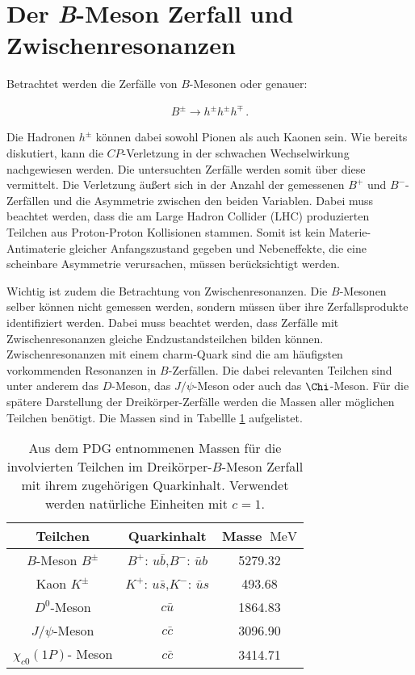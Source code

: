 \section{Der \textbf{\textit{B}}-Meson Zerfall und Zwischenresonanzen}

Betrachtet werden die Zerfälle von $B$-Mesonen oder genauer:

\begin{align}
    B^{\pm} \to h^{\pm} h^{\pm}  h^{\mp} \, .
\end{align}

Die Hadronen $h^\pm$ können dabei sowohl Pionen als auch Kaonen sein. Wie bereits diskutiert, kann die
$CP$-Verletzung in der schwachen Wechselwirkung nachgewiesen werden. Die untersuchten Zerfälle
werden somit über diese vermittelt. Die Verletzung äußert sich in der Anzahl der gemessenen
$B^+$ und $B^-$-Zerfällen und die Asymmetrie zwischen den beiden Variablen. Dabei muss beachtet
werden, dass die am Large Hadron Collider (LHC) produzierten Teilchen aus Proton-Proton
Kollisionen stammen. Somit ist kein Materie-Antimaterie gleicher Anfangszustand gegeben
und Nebeneffekte, die eine scheinbare Asymmetrie verursachen, müssen berücksichtigt werden. \par

Wichtig ist zudem die Betrachtung von Zwischenresonanzen. Die $B$-Mesonen selber können nicht
gemessen werden, sondern müssen über ihre Zerfallsprodukte identifiziert werden. Dabei muss
beachtet werden, dass Zerfälle mit Zwischenresonanzen gleiche Endzustandsteilchen bilden
können. Zwischenresonanzen mit einem charm-Quark sind die am häufigsten vorkommenden
Resonanzen in $B$-Zerfällen. Die dabei relevanten Teilchen sind unter anderem das
$D$-Meson, das $J/\psi$-Meson oder auch das $\Chi$-Meson. Für die spätere Darstellung der
Dreikörper-Zerfälle werden die Massen aller möglichen Teilchen benötigt. Die Massen sind in
Tabellle \ref{tab:PDGMassen} aufgelistet.

\begin{table}
    \centering
    \caption{Aus dem PDG \cite{PDG} entnommenen Massen für die involvierten Teilchen im
        Dreikörper-$B$-Meson Zerfall mit ihrem zugehörigen Quarkinhalt. Verwendet werden natürliche
        Einheiten mit $c = 1$.}
    \label{tab:PDGMassen}
    \begin{tabular}{c c c}
    \toprule
    {Teilchen} & {Quarkinhalt} & {Masse $\SI{}{\mega\electronvolt}$} \\
    \midrule
    {$B$-Meson $B^{\pm}$} & {$B^+$: $u\bar{b}$,$B^-$: $\bar{u}b$} & 5279.32 \\
    {Kaon $K^{\pm}$} & {$K^+$: $u\bar{s}$,$K^-$: $\bar{u}s$} & 493.68 \\
    {$D^0$-Meson} & {$c\bar{u}$} & 1864.83 \\
    {$J/\psi$-Meson} &{$c\bar{c}$} & 3096.90 \\
    {$\chi_{c0}\left(1P\right)$- Meson} & {$c\bar{c}$}& 3414.71 \\
    \bottomrule
    \end{tabular}
\end{table}
